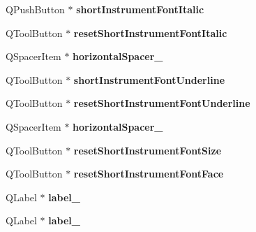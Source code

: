\begin{DoxyCompactItemize}
Q\+Push\+Button $\ast$ {\bfseries short\+Instrument\+Font\+Italic}
\item 
\mbox{\label{class_ui___edit_style_base_ae6dc59696c9dc734bdee58502f4abed4}} 
Q\+Tool\+Button $\ast$ {\bfseries reset\+Short\+Instrument\+Font\+Italic}
\item 
\mbox{\label{class_ui___edit_style_base_ad08080453dcbae9b13698200daea01c4}} 
Q\+Spacer\+Item $\ast$ {\bfseries horizontal\+Spacer\+\_}
\item 
\mbox{\label{class_ui___edit_style_base_a94a6c983c3bf0b2d23bcdbe182467cf9}} 
Q\+Tool\+Button $\ast$ {\bfseries short\+Instrument\+Font\+Underline}
\item 
\mbox{\label{class_ui___edit_style_base_a98b39caafd6d6d2710d3bdb1dd351244}} 
Q\+Tool\+Button $\ast$ {\bfseries reset\+Short\+Instrument\+Font\+Underline}
\item 
\mbox{\label{class_ui___edit_style_base_a1fb00244f7a7ed21c0cd754b450722a5}} 
Q\+Spacer\+Item $\ast$ {\bfseries horizontal\+Spacer\+\_}
\item 
\mbox{\label{class_ui___edit_style_base_a73832ee467810298093266c2760ce768}} 
Q\+Tool\+Button $\ast$ {\bfseries reset\+Short\+Instrument\+Font\+Size}
\item 
\mbox{\label{class_ui___edit_style_base_ae19733e485444fb2b54fa25f755e60c9}} 
Q\+Tool\+Button $\ast$ {\bfseries reset\+Short\+Instrument\+Font\+Face}
\item 
\mbox{\label{class_ui___edit_style_base_a450a564043b1b8a1d205dc7d9be4c91e}} 
Q\+Label $\ast$ {\bfseries label\+\_}
\item 
\mbox{\label{class_ui___edit_style_base_a50812dfee1a0d48122e597de96e4b9a8}} 
Q\+Label $\ast$ {\bfseries label\+\_}
\item 
\mbox{\label{class_ui___edit_style_base_af9697240087450106eedc0e344d0b47d}} 

\end{DoxyCompactItemize}
